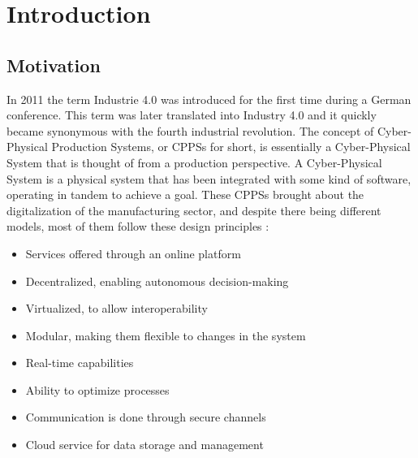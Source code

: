 

\chapter{Introduction}
\label{cha:introduction}

\section{Motivation}
\label{sec:motivation}

In 2011 the term Industrie 4.0 was introduced for the first time during a German conference. This term was later translated into Industry 4.0 and it quickly became synonymous with the fourth industrial revolution. The concept of Cyber-Physical Production Systems, or CPPSs for short, is essentially a Cyber-Physical System that is thought of from a production perspective. A Cyber-Physical System is a physical system that has been integrated with some kind of software, operating in tandem to achieve a goal.
These CPPSs brought about the digitalization of the manufacturing sector, and despite there being different models, most of them follow these design principles \cite{birgit01}:

\begin{itemize}
	\item Services offered through an online platform
	\item Decentralized, enabling autonomous decision-making
	\item Virtualized, to allow interoperability
	\item Modular, making them flexible to changes in the system
	\item Real-time capabilities
	\item Ability to optimize processes
	\item Communication is done through secure channels
	\item Cloud service for data storage and management
\end{itemize}

